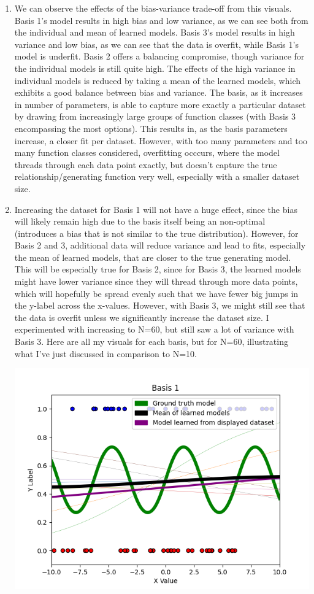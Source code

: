 \documentclass[submit]{harvardml}
\begin{document}
\begin{enumerate}
    \item We can observe the effects of the bias-variance trade-off from this visuals. Basis 1's model results in high bias and low variance, as we can see both from the individual and mean of learned models.  Basis 3's model results in high variance and low bias, as we can see that the data is overfit, while Basis 1's model is underfit. Basis 2 offers a balancing compromise, though variance for the individual models is still quite high. The effects of the high variance in individual models is reduced by taking a mean of the learned models, which exhibits a good balance between bias and variance. The basis, as it increases in number of parameters, is able to capture more exactly a particular dataset by drawing from increasingly large groups of function classes (with Basis 3 encompassing the most options). This results in, as the basis parameters increase, a closer fit per dataset. However, with too many parameters and too many function classes considered, overfitting occcurs, where the model threads through each data point exactly, but doesn't capture the true relationship/generating function very well, especially with a smaller dataset size. 
    
    \item Increasing the dataset for Basis 1 will not have a huge effect, since the bias will likely remain high due to the basis itself being an non-optimal (introduces a bias that is not similar to the true distribution). However, for Basis 2 and 3, additional data will reduce variance and lead to fits, especially the mean of learned models, that are closer to the true generating model. This will be especially true for Basis 2, since for Basis 3, the learned models might have lower variance since they will thread through more data points, which will hopefully be spread evenly such that we have fewer big jumps in the y-label across the x-values. However, with Basis 3, we might still see that the data is overfit unless we significantly increase the dataset size. I experimented with increasing to N=60, but still saw a lot of variance with Basis 3. Here are all my visuals for each basis, but for N=60, illustrating what I've just discussed in comparison to N=10. 
    
    \includegraphics[width=.7\textwidth]{Basis1-60pts.png}


\end{enumerate}
\end{document}
